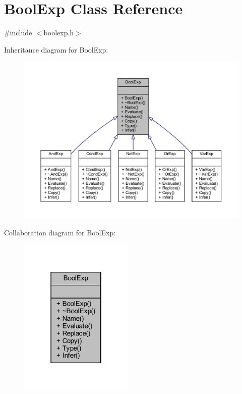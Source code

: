 \hypertarget{classBoolExp}{}\section{Bool\+Exp Class Reference}
\label{classBoolExp}


{\ttfamily \#include $<$boolexp.\+h$>$}



Inheritance diagram for Bool\+Exp\+:
\nopagebreak
\begin{figure}[H]
\begin{center}
\leavevmode
\includegraphics[width=350pt]{classBoolExp__inherit__graph}
\end{center}
\end{figure}


Collaboration diagram for Bool\+Exp\+:
\nopagebreak
\begin{figure}[H]
\begin{center}
\leavevmode
\includegraphics[width=154pt]{classBoolExp__coll__graph}
\end{center}
\end{figure}
